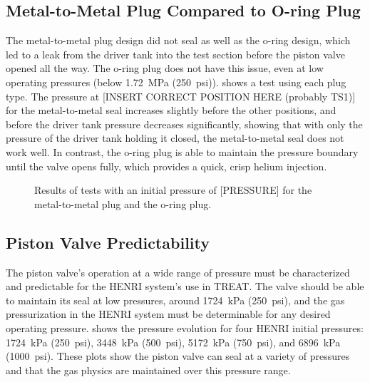 
\subsection{Metal-to-Metal Plug Compared to O-ring Plug}
The metal-to-metal plug design did not seal as well as the o-ring design, which led to a leak from the driver tank into the test section before the piston valve opened all the way. The o-ring plug does not have this issue, even at low operating pressures (below \SI{1.72}{\mega\pascal} (\SI{250}{psi})).  shows a test using each plug type. The pressure at [INSERT CORRECT POSITION HERE (probably TS1)] for the metal-to-metal seal increases slightly before the other positions, and before the driver tank pressure decreases significantly, showing that with only the pressure of the driver tank holding it closed, the metal-to-metal seal does not work well. In contrast, the o-ring plug is able to maintain the pressure boundary until the valve opens fully, which provides a quick, crisp helium injection.

\begin{figure}
    \vspace{16pt}
    \centering
    \caption{Results of tests with an initial pressure of [PRESSURE] for the metal-to-metal plug and the o-ring plug.}
    \label{fig:metal vs oring}
    \vspace{16pt}
\end{figure}

\subsection{Piston Valve Predictability}
The piston valve's operation at a wide range of pressure must be characterized and predictable for the HENRI system's use in TREAT. The valve should be able to maintain its seal at low pressures, around \SI{1724}{\kilo\pascal} (\SI{250}{psi}), and the gas pressurization in the HENRI system must be determinable for any desired operating pressure.  shows the pressure evolution for four HENRI initial pressures: \SI{1724}{\kilo\pascal} (\SI{250}{psi}), \SI{3448}{\kilo\pascal} (\SI{500}{psi}), \SI{5172}{\kilo\pascal} (\SI{750}{psi}), and \SI{6896}{\kilo\pascal} (\SI{1000}{psi}). These plots show the piston valve can seal at a variety of pressures and that the gas physics are maintained over this pressure range.

